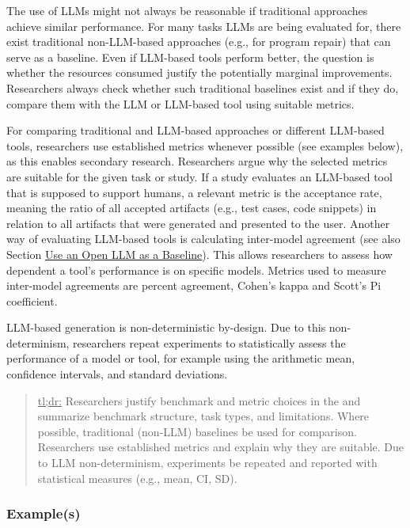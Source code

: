 The use of LLMs might not always be reasonable if traditional approaches achieve similar performance. 
For many tasks LLMs are being evaluated for, there exist traditional non-LLM-based approaches (e.g., for program repair) that can serve as a baseline.
Even if LLM-based tools perform better, the question is whether the resources consumed justify the potentially marginal improvements.
Researchers \should always check whether such traditional baselines exist and if they do, compare them with the LLM or LLM-based tool using suitable metrics.

For comparing traditional and LLM-based approaches or different LLM-based tools, researchers \should use established metrics whenever possible (see examples below), as this enables secondary research.
Researchers \must argue why the selected metrics are suitable for the given task or study. 
If a study evaluates an LLM-based tool that is supposed to support humans, a relevant metric is the acceptance rate, meaning the ratio of all accepted artifacts (e.g., test cases, code snippets) in relation to all artifacts that were generated and presented to the user.
Another way of evaluating LLM-based tools is calculating inter-model agreement (see also Section \href{/guidelines/#use-an-open-llm-as-a-baseline}{Use an Open LLM as a Baseline}).
This allows researchers to assess how dependent a tool's performance is on specific models.
Metrics used to measure inter-model agreements are percent agreement, Cohen's kappa and Scott's Pi coefficient.

LLM-based generation is non-deterministic by-design.
Due to this non-determinism, researchers \should repeat experiments to statistically assess the performance of a model or tool, for example using the arithmetic mean, confidence intervals, and standard deviations.

\begin{quote}
\underline{tl;dr:} Researchers \must justify benchmark and metric choices in the \paper and \should summarize benchmark structure, task types, and limitations. Where possible, traditional (non-LLM) baselines \should be used for comparison. Researchers \should use established metrics and \must explain why they are suitable. Due to LLM non-determinism, experiments \should be repeated and reported with statistical measures (e.g., mean, CI, SD).
\end{quote}

\subsubsection{Example(s)}


